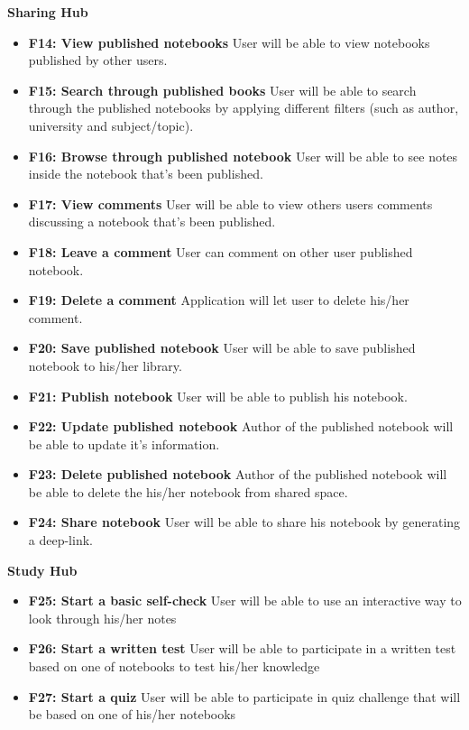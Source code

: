 \documentclass[thesis=B,english]{FITthesis}[2012/10/20]
\begin{document}
\bigskip
\textbf{Sharing Hub}
\begin{itemize}
	\item \textbf{F14: View published notebooks} User will be able to view notebooks published by other users.
	\item \textbf{F15: Search through published books} User will be able to search through the published notebooks by applying different filters (such as author, university and subject/topic).
	\item \textbf{F16: Browse through published notebook} User will be able to see notes inside the notebook that's been published.
	\item \textbf{F17: View comments} User will be able to view others users comments discussing a notebook that's been published.
	\item \textbf{F18: Leave a comment} User can comment on other user published notebook.
	\item \textbf{F19: Delete a comment} Application will let user to delete his/her comment.
	\item \textbf{F20: Save published notebook} User will be able to save published notebook to his/her library.
	\item \textbf{F21: Publish notebook} User will be able to publish his notebook.
	\item \textbf{F22: Update published notebook} Author of the published notebook will be able to update it's information.
	\item \textbf{F23: Delete published notebook} Author of the published notebook will be able to delete the his/her notebook from shared space.
	\item \textbf{F24: Share notebook} User will be able to share his notebook by generating a deep-link.
 \end{itemize}

\bigskip
\textbf{Study Hub}
\begin{itemize}
	\item \textbf{F25: Start a basic self-check} User will be able to use an interactive way to look through his/her notes
	\item \textbf{F26: Start a written test} User will be able to participate in a written test based on one of notebooks to test his/her knowledge
	\item \textbf{F27: Start a quiz} User will be able to participate in quiz challenge that will be based on one of his/her notebooks
	
\end{itemize}
\end{document}
